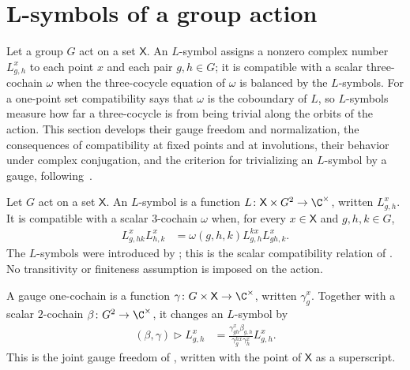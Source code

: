 \section{L-symbols of a group action}
\label{sec:threecocycle_lsymbols}

Let a group $G$ act on a set $\mathsf X$. An $L$-symbol assigns a nonzero
complex number $L^x_{g,h}$ to each point $x$ and each pair $g,h\in G$; it is
compatible with a scalar three-cochain $\omega$ when the three-cocycle equation
of $\omega$ is balanced by the $L$-symbols. For a one-point set compatibility
says that $\omega$ is the coboundary of $L$, so $L$-symbols measure how far a
three-cocycle is from being trivial along the orbits of the action. This
section develops their gauge freedom and normalization, the consequences of
compatibility at fixed points and at involutions, their behavior under complex
conjugation, and the criterion for trivializing an $L$-symbol by a gauge,
following~\cite{GarreRubio2023MPOSym,FrancoRubio2025MPUGauging}.

\begin{definition}
    \label{def:mpug_l_symbols}
    \leanok
    Let $G$ act on a set $\mathsf X$. An $L$-symbol is a function
    $L\colon \mathsf X\times G^2\to\C^\times$, written $L^x_{g,h}$.
    It is compatible with a scalar $3$-cochain $\omega$ when, for every
    $x\in\mathsf X$ and $g,h,k\in G$,
    \begin{align}
        L^x_{g,hk}L^x_{h,k}
         & =\omega(g,h,k)L^{k x}_{g,h}L^x_{gh,k}.
        \label{eq:mpug_l_compatibility}
    \end{align}
    The $L$-symbols were introduced by
    \cite{GarreRubio2023MPOSym}; this is the scalar compatibility relation of
    \cite{FrancoRubio2025MPUGauging}. No transitivity or finiteness assumption
    is imposed on the action.
\end{definition}

\begin{definition}
    \label{def:mpug_l_gauge}
    \leanok
    A gauge one-cochain is a function
    $\gamma\colon G\times\mathsf X\to\C^\times$, written $\gamma^x_g$.
    Together with a scalar $2$-cochain $\beta\colon G^2\to\C^\times$,
    it changes an $L$-symbol by
    \begin{align}
        (\beta,\gamma)\mathbin{\triangleright}L^x_{g,h}
         & =\frac{\gamma^x_{gh}\beta_{g,h}}
            {\gamma^{h x}_g\gamma^x_h}L^x_{g,h}.
        \label{eq:mpug_l_gauge}
    \end{align}
    This is the joint gauge freedom of \cite{FrancoRubio2025MPUGauging},
    written with the point of $\mathsf X$ as a superscript.
\end{definition}

